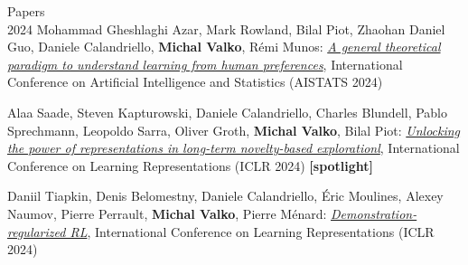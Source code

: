 \documentclass{resume}
\begin{document}
\begin{category}{Papers\\2024}
\citembullet
Mohammad Gheshlaghi Azar, Mark Rowland, Bilal Piot, Zhaohan Daniel Guo, Daniele Calandriello,  {\bf Michal Valko},  R\' emi Munos:
\href{https://arxiv.org/pdf/2310.12036}{\emph{A general theoretical paradigm to understand learning from human preferences}},
International Conference on Artificial Intelligence and Statistics
({\sf AISTATS 2024}) 

\citembullet
Alaa Saade, Steven Kapturowski, Daniele Calandriello, Charles Blundell, Pablo Sprechmann, Leopoldo Sarra, Oliver Groth,  {\bf Michal Valko}, Bilal Piot:
\href{https://arxiv.org/pdf/2305.01521.pdf}{\emph{Unlocking the power of representations in long-term novelty-based explorationl}},
International Conference on Learning Representations
({\sf ICLR 2024})  {\bf [spotlight]}

\citembullet
Daniil Tiapkin, Denis Belomestny, Daniele Calandriello, \' Eric Moulines, Alexey Naumov,  Pierre Perrault, {\bf Michal Valko}, Pierre M\' enard: 
\href{https://arxiv.org/pdf/2310.17303}{\emph{Demonstration-regularized RL}},
International Conference on Learning Representations
({\sf ICLR 2024})  

\end{category}
\end{document}
